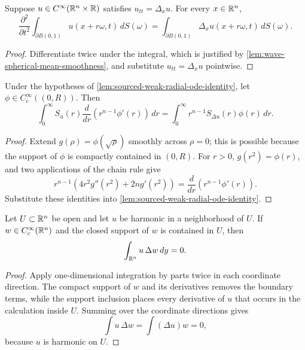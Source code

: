 \begin{lemma}
\label{lem:wave-spherical-mean-time-derivative}


Suppose $u\in C^\infty(\mathbb{R}^n\times\mathbb{R})$ satisfies $u_{tt}=\Delta_xu$.
For every $x\in\mathbb{R}^n$,
\[
\frac{\partial^2}{\partial t^2}
\int_{\partial B(0,1)}u(x+r\omega,t)\,dS(\omega)
=\int_{\partial B(0,1)}\Delta_xu(x+r\omega,t)\,dS(\omega).
\]
\end{lemma}
\begin{proof}

Differentiate twice under the integral, which is justified by
\cref{lem:wave-spherical-mean-smoothness}, and substitute
$u_{tt}=\Delta_xu$ pointwise.
\end{proof}

\begin{lemma}
\label{lem:weak-divergence-form-radial-equation}


Under the hypotheses of
\cref{lem:sourced-weak-radial-ode-identity}, let
$\phi\in C_c^\infty((0,R))$. Then
\[
\int_0^\infty S_u(r)
  \frac{d}{dr}\left(r^{n-1}\phi'(r)\right)\,dr
=\int_0^\infty r^{n-1}S_{\Delta u}(r)\phi(r)\,dr.
\]
\end{lemma}
\begin{proof}

Extend $g(\rho)=\phi(\sqrt\rho)$ smoothly across $\rho=0$; this is possible
because the support of $\phi$ is compactly contained in $(0,R)$. For $r>0$,
$g(r^2)=\phi(r)$, and two applications of the chain rule give
\[
r^{n-1}\left(4r^2g''(r^2)+2n g'(r^2)\right)
=\frac{d}{dr}\left(r^{n-1}\phi'(r)\right).
\]
Substitute these identities into
\cref{lem:sourced-weak-radial-ode-identity}.
\end{proof}

\begin{lemma}
\label{lem:weak-green-identity-compact-test}


Let $U \subset \mathbb{R}^n$ be open and let $u$ be harmonic in a neighborhood of $U$.
If $w \in C_c^\infty(\mathbb{R}^n)$ and the closed support of $w$ is contained in $U$, then
\[
\int_{\mathbb{R}^n} u\,\Delta w\,dy = 0.
\]
\end{lemma}
\begin{proof}

Apply one-dimensional integration by parts twice in each coordinate direction.
The compact support of $w$ and its derivatives removes the boundary terms, while
the support inclusion places every derivative of $u$ that occurs in the calculation
inside $U$. Summing over the coordinate directions gives
\[
\int u\,\Delta w = \int (\Delta u)w = 0,
\]
because $u$ is harmonic on $U$.
\end{proof}

